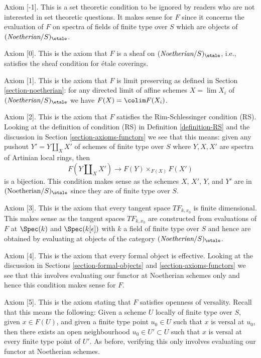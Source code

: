 \medskip\noindent
Axiom [-1]. This is a set theoretic condition to be ignored
by readers who are not interested in set theoretic questions.
It makes sense for $F$ since it concerns the evaluation of
$F$ on spectra of fields of finite type over $S$ which are
objects of $(\textit{Noetherian}/S)_\etale$.

\medskip\noindent
Axiom [0]. This is the axiom that $F$ is a sheaf
on $(\textit{Noetherian}/S)_\etale$, i.e., satisfies
the sheaf condition for \'etale coverings.

\medskip\noindent
Axiom [1]. This is the axiom that $F$ is limit preserving as defined
in Section \ref{section-noetherian}:  for any
directed limit of affine schemes $X = \lim X_i$ of
$(\textit{Noetherian}/S)_\etale$ we have $F(X) = \colim F(X_i)$.

\medskip\noindent
Axiom [2]. This is the axiom that  $F$ satisfies the Rim-Schlessinger
condition (RS). Looking at the definition of condition (RS) in
Definition \ref{definition-RS} and the discussion in
Section \ref{section-axioms-functors}
we see that this means: given any pushout $Y' = Y \amalg_X X'$
of schemes of finite type over $S$ where $Y, X, X'$
are spectra of Artinian local rings, then
$$
F(Y \amalg_X X') \to F(Y) \times_{F(X)} F(X')
$$
is a bijection. This condition makes sense as the schemes
$X$, $X'$, $Y$, and $Y'$ are in $(\text{Noetherian}/S)_\etale$
since they are of finite type over $S$.

\medskip\noindent
Axiom [3]. This is the axiom that every tangent space $TF_{k, x_0}$
is finite dimensional. This makes sense as the tangent spaces $TF_{k, x_0}$
are constructed from evaluations of $F$ at $\Spec(k)$ and
$\Spec(k[\epsilon])$ with $k$ a field of finite type over $S$
and hence are obtained by evaluating at objects of the category
$(\textit{Noetherian}/S)_\etale$.

\medskip\noindent
Axiom [4]. This is the axiom that every formal object is effective.
Looking at the discussion in
Sections \ref{section-formal-objects} and \ref{section-axioms-functors}
we see that this involves evaluating our functor at Noetherian schemes
only and hence this condition makes sense for $F$.

\medskip\noindent
Axiom [5]. This is the axiom stating that $F$ satisfies openness of versality.
Recall that this means the following: Given a scheme $U$
locally of finite type over $S$, given $x \in F(U)$, and given
a finite type point $u_0 \in U$ such that $x$ is versal at $u_0$,
then there exists an open neighbourhood $u_0 \in U' \subset U$
such that $x$ is versal at every finite type point of $U'$.
As before, verifying this only involves evaluating
our functor at Noetherian schemes.

